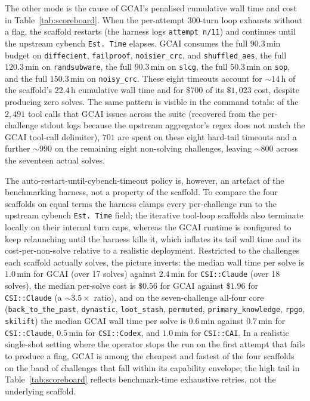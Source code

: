 The other mode is the cause of GCAI's penalised cumulative wall time and cost in Table~\ref{tab:scoreboard}. When the per-attempt $300$-turn loop exhausts without a flag, the scaffold restarts (the harness logs \texttt{attempt n/11}) and continues until the upstream cybench \texttt{Est.~Time} elapses. GCAI consumes the full $90.3$\,min budget on \texttt{diffecient}, \texttt{failproof}, \texttt{noisier\_crc}, and \texttt{shuffled\_aes}, the full $120.3$\,min on \texttt{randsubware}, the full $90.3$\,min on \texttt{slcg}, the full $50.3$\,min on \texttt{sop}, and the full $150.3$\,min on \texttt{noisy\_crc}. These eight timeouts account for $\sim 14$\,h of the scaffold's $22.4$\,h cumulative wall time and for $\$700$ of its $\$1{,}023$ cost, despite producing zero solves. The same pattern is visible in the command totals: of the $2{,}491$ tool calls that GCAI issues across the suite (recovered from the per-challenge stdout logs because the upstream aggregator's regex does not match the GCAI tool-call delimiter), $701$ are spent on these eight hard-tail timeouts and a further $\sim 990$ on the remaining eight non-solving challenges, leaving $\sim 800$ across the seventeen actual solves.

The auto-restart-until-cybench-timeout policy is, however, an artefact of the benchmarking harness, not a property of the scaffold. To compare the four scaffolds on equal terms the harness clamps every per-challenge run to the upstream cybench \texttt{Est.~Time} field; the iterative tool-loop scaffolds also terminate locally on their internal turn caps, whereas the GCAI runtime is configured to keep relaunching until the harness kills it, which inflates its tail wall time and its cost-per-non-solve relative to a realistic deployment. Restricted to the challenges each scaffold actually solves, the picture inverts: the median wall time per solve is $1.0$\,min for GCAI (over 17 solves) against $2.4$\,min for \texttt{CSI::Claude} (over 18 solves), the median per-solve cost is $\$0.56$ for GCAI against $\$1.96$ for \texttt{CSI::Claude} (a $\sim 3.5\times$ ratio), and on the seven-challenge all-four core (\texttt{back\_to\_the\_past}, \texttt{dynastic}, \texttt{loot\_stash}, \texttt{permuted}, \texttt{primary\_knowledge}, \texttt{rpgo}, \texttt{skilift}) the median GCAI wall time per solve is $0.6$\,min against $0.7$\,min for \texttt{CSI::Claude}, $0.5$\,min for \texttt{CSI::Codex}, and $1.0$\,min for \texttt{CSI::CAI}. In a realistic single-shot setting where the operator stops the run on the first attempt that fails to produce a flag, GCAI is among the cheapest and fastest of the four scaffolds on the band of challenges that fall within its capability envelope; the high tail in Table~\ref{tab:scoreboard} reflects benchmark-time exhaustive retries, not the underlying scaffold.

